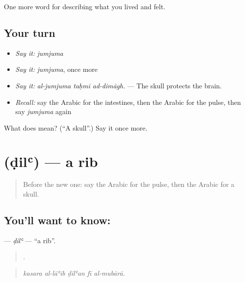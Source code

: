 \begin{grammarlens}[title={What you've built}]
One more word for describing what you lived and felt.
\end{grammarlens}

\subsection*{Your turn}
\begin{itemize}
\raggedright
  \item \emph{Say it:} \emph{jumjuma}
  \item \emph{Say it:} \emph{jumjuma}, once more
  \item \emph{Say it:} \emph{al-jumjuma taḥmī ad-dimāgh.} — The skull protects the brain.
  \item \emph{Recall:} say the Arabic for the intestines, then the Arabic for the pulse, then say \emph{jumjuma} again
\end{itemize}

\begin{tcolorbox}[breakable,colback=teal!4,colframe=teal!35!black,title={Before you move on}]
What does  mean? (\textquotedblleft{}A skull\textquotedblright{}.) Say it once more.
\end{tcolorbox}
\section[\texorpdfstring{\ar{ضلع} (ḍilʿ)}{ضلع (ḍilʿ)}]{ (ḍilʿ) — a rib}

\label{lesson:AR-C505-dil}



\begin{quote}
Before the new one: say the Arabic for the pulse, then the Arabic for a skull.
\end{quote}

\subsection*{You'll want to know: }
\textbf{} — \emph{ḍilʿ} — \textquotedblleft{}a rib\textquotedblright{}.

\begin{quote}
    .
\end{quote}

\begin{quote}
\emph{kasara al-lāʿib ḍilʿan fī al-mubārā.}
\end{quote}

